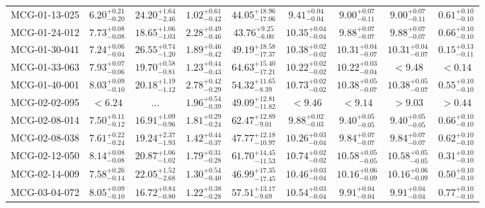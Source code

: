 \documentclass[onecolumn]{mn2e}
\begin{document}
{\begin{center}
\begin{longtable}{lcccccccc}
MCG-01-13-025 & $6.20_{-0.20}^{+0.21}$ & $24.20_{-2.46}^{+1.64}$ & $1.02_{-0.42}^{+0.61}$ &$44.05_{-17.06}^{+18.96}$ & $9.41_{-0.04}^{+0.04}$ & $9.00_{-0.11}^{+0.07}$ & $9.00_{-0.11}^{+0.07}$ & $0.61_{-0.10}^{+0.10}$ \\
MCG-01-24-012 & $7.73_{-0.08}^{+0.08}$ & $18.65_{-1.03}^{+1.06}$ & $2.28_{-0.46}^{+0.49}$ &$43.76_{-6.00}^{+9.25}$ & $10.35_{-0.04}^{+0.04}$ & $9.88_{-0.07}^{+0.07}$ & $9.88_{-0.07}^{+0.07}$ & $0.66_{-0.10}^{+0.10}$ \\
MCG-01-30-041 & $7.24_{-0.04}^{+0.06}$ & $26.55_{-1.20}^{+0.74}$ & $1.89_{-0.42}^{+0.46}$ &$49.19_{-17.37}^{+18.58}$ & $10.38_{-0.02}^{+0.02}$ & $10.31_{-0.07}^{+0.04}$ & $10.31_{-0.07}^{+0.04}$ & $0.15_{-0.11}^{+0.13}$ \\
MCG-01-33-063 & $7.93_{-0.06}^{+0.07}$ & $19.70_{-0.81}^{+0.58}$ & $1.23_{-0.43}^{+0.44}$ &$64.63_{-17.21}^{+15.40}$ & $10.22_{-0.02}^{+0.02}$ & $10.22_{-0.04}^{+0.03}$ & $<9.48$ & $<0.14$ \\
MCG-01-40-001 & $8.03_{-0.10}^{+0.09}$ & $20.18_{-1.12}^{+1.19}$ & $2.78_{-0.29}^{+0.42}$ &$54.32_{-8.39}^{+11.65}$ & $10.73_{-0.02}^{+0.02}$ & $10.38_{-0.07}^{+0.05}$ & $10.38_{-0.07}^{+0.05}$ & $0.55_{-0.10}^{+0.10}$ \\
MCG-02-02-095 & $<6.24$ & ... & $1.96_{-0.39}^{+0.54}$ &$49.09_{-11.82}^{+12.81}$ & $<9.46$ & $<9.14$ & $>9.03$ & $>0.44$ \\
MCG-02-08-014 & $7.50_{-0.12}^{+0.11}$ & $16.91_{-0.96}^{+1.09}$ & $1.81_{-0.24}^{+0.29}$ &$62.47_{-9.01}^{+12.89}$ & $9.88_{-0.03}^{+0.02}$ & $9.40_{-0.05}^{+0.05}$ & $9.40_{-0.05}^{+0.05}$ & $0.66_{-0.10}^{+0.10}$ \\
MCG-02-08-038 & $7.61_{-0.24}^{+0.22}$ & $19.24_{-1.93}^{+2.37}$ & $1.42_{-0.37}^{+0.44}$ &$47.77_{-10.97}^{+12.18}$ & $10.26_{-0.04}^{+0.03}$ & $9.84_{-0.07}^{+0.07}$ & $9.84_{-0.07}^{+0.07}$ & $0.62_{-0.10}^{+0.10}$ \\
MCG-02-12-050 & $8.14_{-0.08}^{+0.08}$ & $20.87_{-1.02}^{+1.06}$ & $1.79_{-0.28}^{+0.31}$ &$61.70_{-11.53}^{+14.45}$ & $10.74_{-0.02}^{+0.02}$ & $10.58_{-0.05}^{+0.05}$ & $10.58_{-0.05}^{+0.05}$ & $0.31_{-0.10}^{+0.10}$ \\
MCG-02-14-009 & $7.58_{-0.14}^{+0.26}$ & $22.05_{-2.68}^{+1.52}$ & $1.30_{-0.40}^{+0.54}$ &$46.99_{-17.45}^{+17.35}$ & $10.46_{-0.04}^{+0.03}$ & $10.16_{-0.09}^{+0.06}$ & $10.16_{-0.09}^{+0.06}$ & $0.50_{-0.10}^{+0.10}$ \\
MCG-03-04-072 & $8.05_{-0.10}^{+0.09}$ & $16.72_{-0.80}^{+0.84}$ & $1.22_{-0.28}^{+0.38}$ &$57.51_{-9.69}^{+13.17}$ & $10.54_{-0.04}^{+0.03}$ & $9.91_{-0.04}^{+0.04}$ & $9.91_{-0.04}^{+0.04}$ & $0.77_{-0.10}^{+0.10}$ \\

\end{longtable}
\end{center}}
\end{document}
